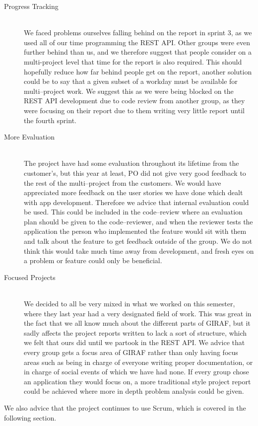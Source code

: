 \begin{description}
	\item[Progress Tracking] \hfill \\
	We faced problems ourselves falling behind on the report in sprint 3, as we used all of our time programming the REST API.
	Other groups were even further behind than us, and we therefore suggest that people consider on a multi-project level that time for the report is also required.
	This should hopefully reduce how far behind people get on the report, another solution could be to say that a given subset of a workday must be available for multi--project work.
	We suggest this as we were being blocked on the REST API development due to code review from another group, as they were focusing on their report due to them writing very little report until the fourth sprint.

	\item[More Evaluation] \hfill \\
	The project have had some evaluation throughout its lifetime from the customer's, but this year at least, PO did not give very good feedback to the rest of the multi--project from the customers.
	We would have appreciated more feedback on the user stories we have done which dealt with app development.
	Therefore we advice that internal evaluation could be used.
	This could be included in the code--review where an evaluation plan should be given to the code--reviewer, and when the reviewer tests the application the person who implemented the feature would sit with them and talk about the feature to get feedback outside of the group.
	We do not think this would take much time away from development, and fresh eyes on a problem or feature could only be beneficial.

	\item[Focused Projects] \hfill \\
	We decided to all be very mixed in what we worked on this semester, where they last year had a very designated field of work.
	This was great in the fact that we all know much about the different parts of GIRAF, but it sadly affects the project reports written to lack a sort of structure, which we felt that ours did until we partook in the REST API.
	We advice that every group gets a focus area of GIRAF rather than only having focus areas such as being in charge of everyone writing proper documentation, or in charge of social events of which we have had none.
	If every group chose an application they would focus on, a more traditional style project report could be achieved where more in depth problem analysis could be given.
\end{description}
We also advice that the project continues to use Scrum, which is covered in the following section.

